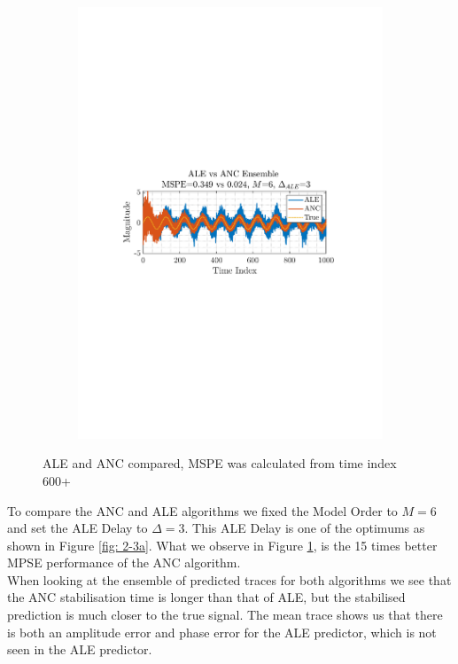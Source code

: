 \documentclass[12pt]{article}
\numberwithin{equation}{section}
\begin{document}
\begin{figure}[H]
\begin{subfigure}{0.49\textwidth}
					\includegraphics[trim={2.2cm 11.2cm 3.00cm  11.2cm}, clip, width=\textwidth]{../MATLAB/figures/q2_3c_fig02.pdf} 
					\captionsetup{justification=centering}
				\end{subfigure}
				\captionsetup{justification=centering}
				\caption{ALE and ANC compared, MSPE was calculated from time index 600+}
				\label{fig: 2-3c}
			\end{figure}
		
			To compare the ANC and ALE algorithms we fixed the Model Order to $M=6$ and set the ALE Delay to $\Delta=3$. This ALE Delay is one of the optimums as shown in Figure \ref{fig: 2-3a}. What we observe in Figure \ref{fig: 2-3c}, is the 15 times better MPSE performance of the ANC algorithm.\\
			When looking at the ensemble of predicted traces for both algorithms we see that the ANC stabilisation time is longer than that of ALE, but the stabilised prediction is much closer to the true signal. The mean trace shows us that there is both an amplitude error and phase error for the ALE predictor, which is not seen in the ALE predictor.
		
\end{document}
